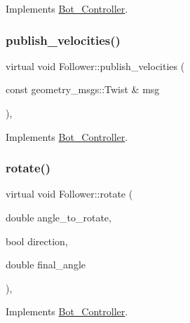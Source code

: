 Implements \hyperlink{class_bot___controller_a5e2f980d71dab69d952c532b5819483b}{Bot\+\_\+\+Controller}.

\mbox{\label{class_follower_ae9e1df72904d2171d99f7bd18ccd89ab}} 
\subsubsection{\texorpdfstring{publish\+\_\+velocities()}{publish\_velocities()}}
{\footnotesize\ttfamily virtual void Follower\+::publish\+\_\+velocities (\begin{DoxyParamCaption}\item[{const geometry\+\_\+msgs\+::\+Twist \&}]{msg }\end{DoxyParamCaption})\hspace{0.3cm}{\ttfamily [override]}, {\ttfamily [virtual]}}



Implements \hyperlink{class_bot___controller_ae357ee9ea3ec7a5000f39532fc52fa72}{Bot\+\_\+\+Controller}.

\mbox{\label{class_follower_ae241d3dc81b6ddebdfbede88e2cebb98}} 
\subsubsection{\texorpdfstring{rotate()}{rotate()}}
{\footnotesize\ttfamily virtual void Follower\+::rotate (\begin{DoxyParamCaption}\item[{double}]{angle\+\_\+to\+\_\+rotate,  }\item[{bool}]{direction,  }\item[{double}]{final\+\_\+angle }\end{DoxyParamCaption})\hspace{0.3cm}{\ttfamily [override]}, {\ttfamily [virtual]}}



Implements \hyperlink{class_bot___controller_a19ba7ced629e4ee9a0743efdef4a5cc7}{Bot\+\_\+\+Controller}.

\mbox{\label{class_follower_a098544bd512f5d5b054e15d173cec066}} 
